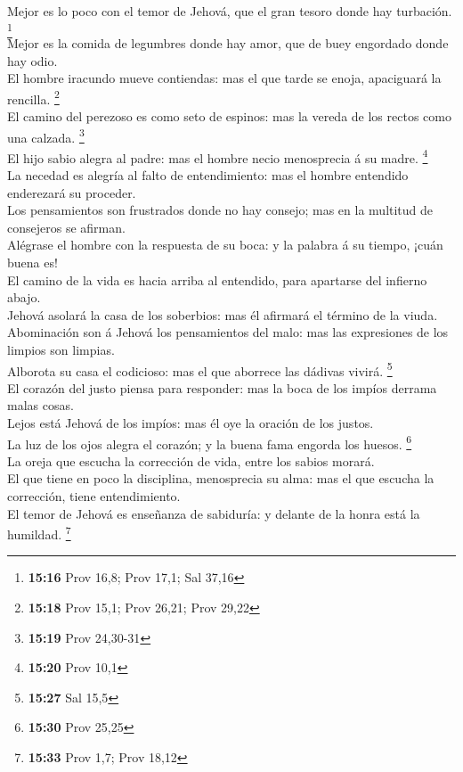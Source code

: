 Mejor es lo poco con el temor de Jehová, que el gran
tesoro donde hay turbación. \footnote{\textbf{15:16} Prov 16,8; Prov
  17,1; Sal 37,16}\\
 Mejor es la comida de legumbres donde hay amor, que de
buey engordado donde hay odio.\\
 El hombre iracundo mueve contiendas: mas el que tarde se
enoja, apaciguará la rencilla. \footnote{\textbf{15:18} Prov 15,1; Prov
  26,21; Prov 29,22}\\
 El camino del perezoso es como seto de espinos: mas la
vereda de los rectos como una calzada. \footnote{\textbf{15:19} Prov
  24,30-31}\\
 El hijo sabio alegra al padre: mas el hombre necio
menosprecia á su madre. \footnote{\textbf{15:20} Prov 10,1}\\
 La necedad es alegría al falto de entendimiento: mas el
hombre entendido enderezará su proceder.\\
 Los pensamientos son frustrados donde no hay consejo; mas
en la multitud de consejeros se afirman.\\
 Alégrase el hombre con la respuesta de su boca: y la
palabra á su tiempo, ¡cuán buena es!\\
 El camino de la vida es hacia arriba al entendido, para
apartarse del infierno abajo.\\
 Jehová asolará la casa de los soberbios: mas él afirmará
el término de la viuda.\\
 Abominación son á Jehová los pensamientos del malo: mas
las expresiones de los limpios son limpias.\\
 Alborota su casa el codicioso: mas el que aborrece las
dádivas vivirá. \footnote{\textbf{15:27} Sal 15,5}\\
 El corazón del justo piensa para responder: mas la boca de
los impíos derrama malas cosas.\\
 Lejos está Jehová de los impíos: mas él oye la oración de
los justos.\\
 La luz de los ojos alegra el corazón; y la buena fama
engorda los huesos. \footnote{\textbf{15:30} Prov 25,25}\\
 La oreja que escucha la corrección de vida, entre los
sabios morará.\\
 El que tiene en poco la disciplina, menosprecia su alma:
mas el que escucha la corrección, tiene entendimiento.\\
 El temor de Jehová es enseñanza de sabiduría: y delante de
la honra está la humildad. \footnote{\textbf{15:33} Prov 1,7; Prov 18,12}

